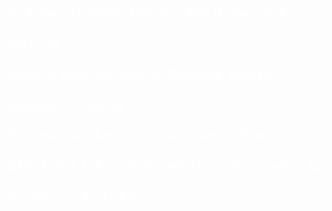 \documentclass[a5paper, twoside]{article}
\begin{document}
\vspace{1em}

\noindent \textcolor{white}{\textbf{Redakce: Dominik Doležel, Jan Romanovský}}

\vspace{1em}

\noindent \textcolor{white}{\textbf{Foto: xx}}

\vspace{1em}

\noindent \textcolor{white}{\textbf{Sazba a grafická úprava: Dominik Doležel}}

\vspace{1em}

\noindent \textcolor{white}{\textbf{Spolupráce: nikdo}}

\vspace{1em}

\noindent \textcolor{white}{\textbf{Účelová publikace -- výtisk je neprodejný.}}

\vspace{1em}

\noindent \textcolor{white}{\textbf{Žádná část tohoto textu nebyla vygenerována AI.}}

\vspace{1em}

\noindent \textcolor{white}{\textbf{Vysázeno v \LaTeX u.}}
\end{document}
